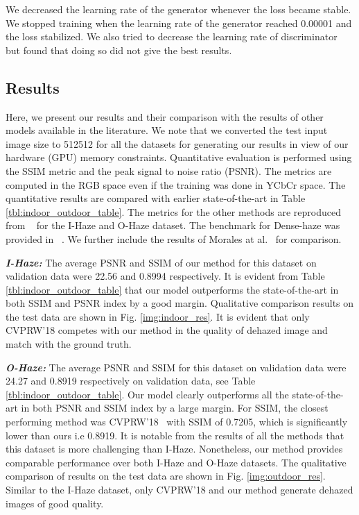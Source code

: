 \documentclass[runningheads]{llncs}
\begin{document}
We decreased the learning rate of the generator whenever the loss became stable. We stopped training when the learning rate of the generator reached 0.00001 and the loss stabilized. We also tried to decrease the learning rate of discriminator but found that doing so did not give the best results. 


\subsection{Results} 
Here, we present our results and their comparison with the results of other models available in the literature. We note that we converted the test input image size to 512512 for all the datasets for generating our results in view of our hardware (GPU) memory constraints. Quantitative evaluation is performed using the SSIM metric and the peak signal to noise ratio (PSNR). The metrics are computed in the RGB space even if the training was done in YCbCr space. The quantitative  results are compared with earlier state-of-the-art in Table \ref{tbl:indoor_outdoor_table}. The metrics for the other methods are reproduced from ~\cite{zhang2018multi} for the I-Haze and O-Haze dataset. The benchmark for Dense-haze was provided in ~\cite{ancuti2019dense}. We further include the results of Morales at al.~\cite{morales2019feature} for comparison.

\textbf{\textit{I-Haze:}} The average PSNR and SSIM of our method for this dataset on validation data were 22.56 and 0.8994 respectively. It is evident from  Table \ref{tbl:indoor_outdoor_table} that our model outperforms the state-of-the-art in both SSIM and PSNR index by a good margin. Qualitative comparison results on the test data are shown in Fig. \ref{img:indoor_res}. It is evident that only CVPRW'18 \cite{zhang2018multi} competes with our method in the quality of dehazed image and match with the ground truth. 

\textbf{\textit{O-Haze:}} The average PSNR and SSIM for this dataset on validation data were 24.27 and 0.8919 respectively on validation data, see Table \ref{tbl:indoor_outdoor_table}. Our model clearly outperforms all the state-of-the-art in both PSNR and SSIM index by a large margin. For SSIM, the closest performing method was CVPRW'18~\cite{zhang2018multi} with SSIM of 0.7205, which is significantly lower than ours i.e 0.8919. It is notable from the results of all the methods that this dataset is more challenging than I-Haze. Nonetheless, our method provides comparable performance over both I-Haze and O-Haze datasets. The qualitative comparison of results on the test data are shown in Fig. \ref{img:outdoor_res}. Similar to the I-Haze dataset, only CVPRW'18 \cite{zhang2018multi} and our method generate dehazed images of good quality. 
\end{document}
